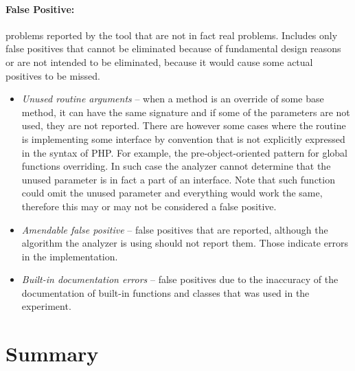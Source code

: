 \paragraph*{False Positive:} problems reported by the tool that 
are not in fact real problems. Includes only false positives 
that cannot be eliminated because of fundamental design reasons 
or are not intended to be eliminated, because it would 
cause some actual positives to be missed.


\begin{itemize}
    \item[] \textit{Unused routine arguments} -- when a method is an override of 
        some base method, it can have the same signature and if some of the 
        parameters are not used, they are not reported. There are however 
        some cases where the routine is implementing some interface by convention 
        that is not explicitly expressed in the syntax of PHP.
        For example, the pre-object-oriented pattern for global functions 
        overriding. In such case the analyzer cannot determine that the unused 
        parameter is in fact a part of an interface. Note that such function 
        could omit the unused parameter and everything would work the same, 
        therefore this may or may not be considered a false positive.
    \item[] \textit{Amendable false positive} -- false positives 
        that are reported, although the algorithm the analyzer 
        is using should not report them. Those indicate errors 
        in the implementation.
    \item[] \textit{Built-in documentation errors} -- false positives 
        due to the inaccuracy of the documentation of built-in 
        functions and classes that was used in the experiment.
\end{itemize}

\section{Summary}

\newcommand{\subcat}[1]{\hspace{0.5cm}\small{\textit{#1}}} 
\newcommand{\reldefret}{\subcat{default return value}}

\newcommand{\sumh}[1]{\textbf{#1}}

